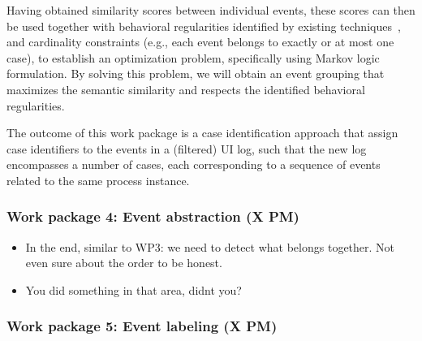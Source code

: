  Having obtained similarity scores between individual events, these scores can then be used together with behavioral regularities identified by existing techniques~\cite{ref}, and cardinality constraints (e.g., each event belongs to exactly or at most one case), to establish an optimization problem, specifically using Markov logic formulation. By solving this problem, we will obtain an event grouping that maximizes the semantic similarity and respects the identified behavioral regularities.

The outcome of this work package is a case identification approach that assign case identifiers to the events in a (filtered) UI log, such that the new log encompasses a number of cases, each corresponding to a sequence of events related to the same process instance.





\subsubsection{Work package 4: Event abstraction (X PM)}
\label{sec:wp4}

\begin{itemize}
\item In the end, similar to WP3: we need to detect what belongs together. Not even sure about the order to be honest. 
\item You did something in that area, didnt you?
\end{itemize}

\subsubsection{Work package 5: Event labeling (X PM)}
\label{sec:wp5}


